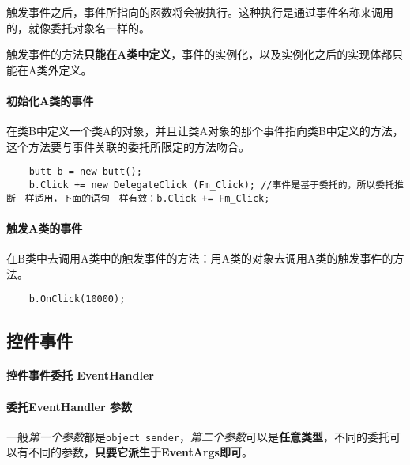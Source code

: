 \documentclass[UTF8,a4paper,12pt]{ctexbook}
\begin{document}
				触发事件之后，事件所指向的函数将会被执行。这种执行是通过事件名称来调用的，就像委托对象名一样的。
				
				触发事件的方法\textbf{只能在A类中定义}，事件的实例化，以及实例化之后的实现体都只能在A类外定义。
				
			\paragraph{初始化A类的事件}
				在类B中定义一个类A的对象，并且让类A对象的那个事件指向类B中定义的方法，这个方法要与事件关联的委托所限定的方法吻合。
			
				\begin{lstlisting}
	butt b = new butt();
	b.Click += new DelegateClick (Fm_Click); //事件是基于委托的，所以委托推断一样适用，下面的语句一样有效：b.Click += Fm_Click;
				\end{lstlisting}
				
			\paragraph{触发A类的事件}
				在B类中去调用A类中的触发事件的方法：用A类的对象去调用A类的触发事件的方法。
				\begin{lstlisting}
	b.OnClick(10000);    
				\end{lstlisting}
			
		\subsection{控件事件}
			\paragraph{控件事件委托 EventHandler}
			
			\paragraph{委托EventHandler 参数}
				
				一般\textit{第一个参数}都是\verb|object sender|，\textit{第二个参数}可以是\textbf{任意类型}，不同的委托可以有不同的参数，\textbf{只要它派生于EventArgs即可}。
			
\end{document}

